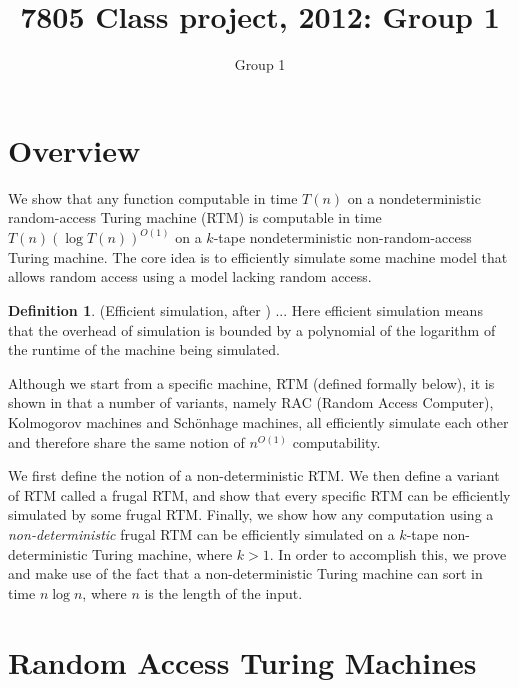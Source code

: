 \documentclass[english]{article}
\theoremstyle{plain}
\theoremstyle{definition}
\newtheorem{defn}[thm]{Definition}
\theoremstyle{plain}
\begin{document}
\title{7805 Class project, 2012: Group 1}
\author{Group 1}
\maketitle

\section{Overview}

We show that any function computable in time $T(n)$ on a
nondeterministic random-access Turing machine (RTM) is computable in
time $T(n)(\log T(n))^{O(1)}$ on a $k$-tape nondeterministic
non-random-access Turing machine. The core idea is to efficiently
simulate some machine model that allows random access using a model
lacking random access.

\begin{defn}
  (Efficient simulation, after \cite{DBLP:conf/ershov/GurevichS89}) ...
Here efficient simulation means that the overhead of
simulation is bounded by a polynomial of the logarithm of the runtime
of the machine being simulated. 
\end{defn}

Although we start from a specific machine, RTM (defined formally
below), it is shown in \cite{DBLP:conf/ershov/GurevichS89} that a
number of variants, namely RAC (Random Access Computer), Kolmogorov
machines and Sch\"{o}nhage machines, all efficiently simulate each
other and therefore share the same notion of $n^{O(1)}$ computability.

We first define the notion of a non-deterministic RTM. We then define
a variant of RTM called a frugal RTM, and show that every specific RTM
can be efficiently simulated by some frugal RTM. Finally, we show how
any computation using a \emph{non-deterministic} frugal RTM can be
efficiently simulated on a $k$-tape non-deterministic Turing machine,
where $k>1$. In order to accomplish this, we prove and make use of the
fact that a non-deterministic Turing machine can sort in time $n \log
n$, where $n$ is the length of the input.

\section{Random Access Turing Machines}	
\end{document}
